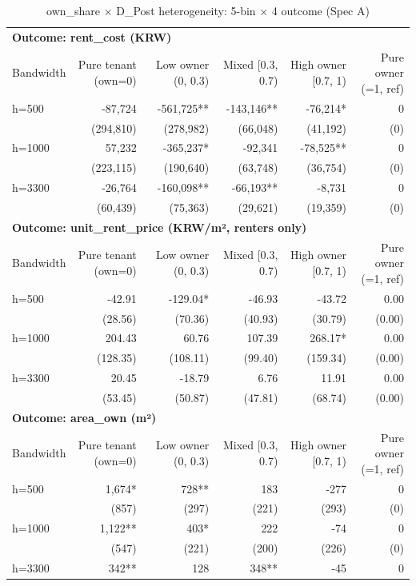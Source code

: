\begin{table}[t]
\centering
\caption{own\_share × D\_Post heterogeneity: 5-bin × 4 outcome (Spec A)}
\label{tab:het_own_share_en}
\begin{tabular}{lrrrrr}
\toprule
\multicolumn{6}{l}{\textbf{Outcome: rent\_cost (KRW)}} \\
Bandwidth & Pure tenant (own=0) & Low owner (0, 0.3) & Mixed [0.3, 0.7) & High owner [0.7, 1) & Pure owner (=1, ref) \\
\midrule
h=500 & -87,724 & -561,725** & -143,146** & -76,214* & 0 \\
    & (294,810) & (278,982) & (66,048) & (41,192) & (0) \\
h=1000 & 57,232 & -365,237* & -92,341 & -78,525** & 0 \\
    & (223,115) & (190,640) & (63,748) & (36,754) & (0) \\
h=3300 & -26,764 & -160,098** & -66,193** & -8,731 & 0 \\
    & (60,439) & (75,363) & (29,621) & (19,359) & (0) \\
\midrule
\multicolumn{6}{l}{\textbf{Outcome: unit\_rent\_price (KRW/m², renters only)}} \\
Bandwidth & Pure tenant (own=0) & Low owner (0, 0.3) & Mixed [0.3, 0.7) & High owner [0.7, 1) & Pure owner (=1, ref) \\
\midrule
h=500 & -42.91 & -129.04* & -46.93 & -43.72 & 0.00 \\
    & (28.56) & (70.36) & (40.93) & (30.79) & (0.00) \\
h=1000 & 204.43 & 60.76 & 107.39 & 268.17* & 0.00 \\
    & (128.35) & (108.11) & (99.40) & (159.34) & (0.00) \\
h=3300 & 20.45 & -18.79 & 6.76 & 11.91 & 0.00 \\
    & (53.45) & (50.87) & (47.81) & (68.74) & (0.00) \\
\midrule
\multicolumn{6}{l}{\textbf{Outcome: area\_own (m²)}} \\
Bandwidth & Pure tenant (own=0) & Low owner (0, 0.3) & Mixed [0.3, 0.7) & High owner [0.7, 1) & Pure owner (=1, ref) \\
\midrule
h=500 & 1,674* & 728** & 183 & -277 & 0 \\
    & (857) & (297) & (221) & (293) & (0) \\
h=1000 & 1,122** & 403* & 222 & -74 & 0 \\
    & (547) & (221) & (200) & (226) & (0) \\
h=3300 & 342** & 128 & 348** & -45 & 0 \\

\end{tabular}
\end{table}
